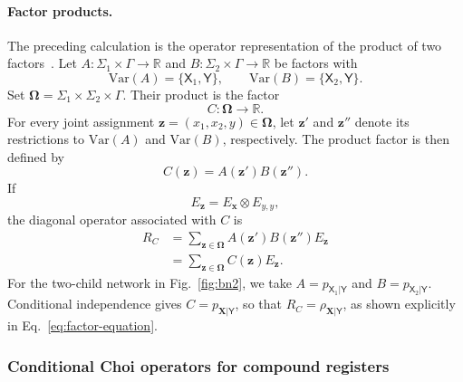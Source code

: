 \documentclass[
    aps,
    pra,
    reprint,
    superscriptaddress,
    nofootinbib
]{revtex4-2}
\theoremstyle{definition}
\theoremstyle{plain}
\begin{document}
\paragraph{Factor products.}

The preceding calculation is the operator representation of the product of
two factors~\cite[Sec.~11.3.1]{Darwiche2008}. Let
$A:\Sigma_{1}\times\Gamma\to\mathbb{R}$ and
$B:\Sigma_{2}\times\Gamma\to\mathbb{R}$ be factors with
\begin{equation}
    \mathrm{Var}(A)=
    \bigl\{\mathsf{X}_{1},\mathsf{Y}\bigr\},
    \qquad
    \mathrm{Var}(B)=
    \bigl\{\mathsf{X}_{2},\mathsf{Y}\bigr\}.
\end{equation}
Set
$\boldsymbol{\Omega}=\Sigma_{1}\times\Sigma_{2}\times\Gamma$.
Their product is the factor
\begin{equation}
    C:
    \boldsymbol{\Omega}
    \to\mathbb{R}.
\end{equation}
For every joint assignment
$\mathbf{z}=(x_{1},x_{2},y)\in\boldsymbol{\Omega}$, let $\mathbf{z}'$ and
$\mathbf{z}''$ denote its restrictions to $\mathrm{Var}(A)$ and
$\mathrm{Var}(B)$, respectively.
The product factor is then defined by
\begin{equation}
    C(\mathbf{z})
    =
    A(\mathbf{z}')B(\mathbf{z}'').
\end{equation}
If
\begin{equation}
    E_{\mathbf{z}}
    =
    E_{\mathbf{x}}\otimes E_{y,y},
\end{equation}
the diagonal operator associated with $C$ is
\begin{equation}
    \begin{aligned}
    R_{C}
    &=
    \sum_{\mathbf{z}\in\boldsymbol{\Omega}}
    A(\mathbf{z}')B(\mathbf{z}'')E_{\mathbf{z}}\\
    &=
    \sum_{\mathbf{z}\in\boldsymbol{\Omega}}
    C(\mathbf{z})E_{\mathbf{z}}.
    \end{aligned}
\end{equation}
For the two-child network in Fig.~\ref{fig:bn2}, we take
$A=p_{\mathsf{X}_{1}|\mathsf{Y}}$ and
$B=p_{\mathsf{X}_{2}|\mathsf{Y}}$. Conditional independence gives
$C=p_{\mathbf{X}|\mathsf{Y}}$, so that
$R_{C}=\rho_{\mathbf{X}|\mathsf{Y}}$, as shown explicitly in
Eq.~\eqref{eq:factor-equation}.

\subsubsection{Conditional Choi operators for compound registers}
\end{document}
